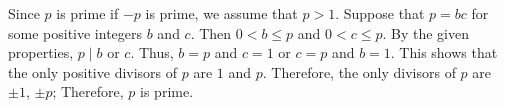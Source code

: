 \documentclass{article}
\begin{document}
\begin{enumerate}
    Since $p$ is prime if $-p$ is prime, we assume that
    $p > 1$. Suppose that $p = bc$ for some positive integers $b$ and $c$. Then
    $0 < b \leq p$ and $0 < c \leq p$. By the given properties, $p\mid b$ or $c$. Thus,
    $b = p$ and $c = 1$ or $c = p$ and $b = 1$. This shows that the only positive
    divisors of $p$ are $1$ and $p$. Therefore, the only divisors of $p$ are $\pm1$, $\pm p$;
    Therefore, $p$ is prime.



\end{enumerate}
    
\end{document}
